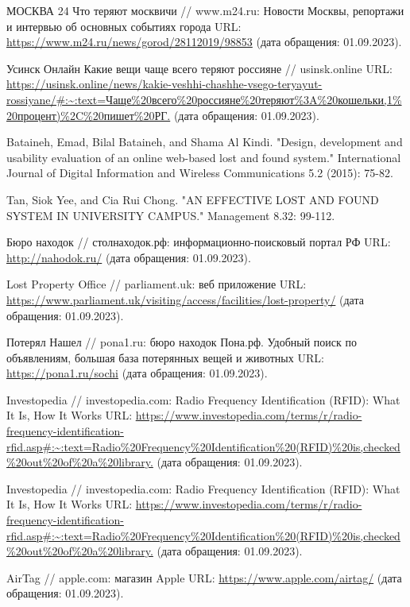 \documentclass{mirea-article}
\begin{document}
	\begin{thebibliography}{99\kern\bibindent}
		 МОСКВА 24 Что теряют москвичи // www.m24.ru: Новости Москвы, репортажи и интервью об основных событиях города URL: \url{https://www.m24.ru/news/gorod/28112019/98853} (дата обращения: 01.09.2023).
		
		 Усинск Онлайн Какие вещи чаще всего теряют россияне // usinsk.online URL: \url{https://usinsk.online/news/kakie-veshhi-chashhe-vsego-teryayut-rossiyane/#:~:text=Чаще%20всего%20россияне%20теряют%3A%20кошельки,1%20процент)%2C%20пишет%20РГ.} (дата обращения: 01.09.2023).
		
		 Bataineh, Emad, Bilal Bataineh, and Shama Al Kindi. "Design, development and usability evaluation of an online web-based lost and found system." International Journal of Digital Information and Wireless Communications 5.2 (2015): 75-82. %
		
		 Tan, Siok Yee, and Cia Rui Chong. "AN EFFECTIVE LOST AND FOUND SYSTEM IN UNIVERSITY CAMPUS." Management 8.32: 99-112. %
		
		
		 Бюро находок // столнаходок.рф: информационно-поисковый портал РФ URL: \url{http://nahodok.ru/} (дата обращения: 01.09.2023).
		
		 Lost Property Office // parliament.uk: веб приложение URL: \url{https://www.parliament.uk/visiting/access/facilities/lost-property/} (дата обращения: 01.09.2023).
		
		 Потерял Нашел // pona1.ru: бюро находок Пона.рф. Удобный поиск по объявлениям, большая база потерянных вещей и животных URL: \url{https://pona1.ru/sochi} (дата обращения: 01.09.2023).
		
		 Investopedia // investopedia.com: Radio Frequency Identification (RFID): What It Is, How It Works URL: \url{https://www.investopedia.com/terms/r/radio-frequency-identification-rfid.asp#:~:text=Radio%20Frequency%20Identification%20(RFID)%20is,checked%20out%20of%20a%20library.} (дата обращения: 01.09.2023).
		
		 Investopedia // investopedia.com: Radio Frequency Identification (RFID): What It Is, How It Works URL: \url{https://www.investopedia.com/terms/r/radio-frequency-identification-rfid.asp#:~:text=Radio%20Frequency%20Identification%20(RFID)%20is,checked%20out%20of%20a%20library.} (дата обращения: 01.09.2023).
		
		 AirTag // apple.com: магазин Apple URL: \url{https://www.apple.com/airtag/} (дата обращения: 01.09.2023).
	\end{thebibliography}
	
\end{document}

